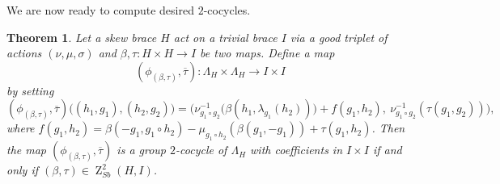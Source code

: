 \documentclass[11pt]{amsart}
\theoremstyle{thrm}
\theoremstyle{plain}
\newtheorem{thm}{Theorem}[section]
\theoremstyle{definition}
\newcommand{\Z}{\operatorname{Z} }
\numberwithin{equation}{section}
\begin{document}
We are now ready to compute desired $2$-cocycles.
\begin{thm}
Let a skew brace $H$ act on a trivial brace $I$ via a good triplet of actions $(\nu,  \mu, \sigma)$ and $\beta, \tau : H \times H \rightarrow I$ be two maps. Define a map
$$(\phi_{(\beta, \tau)}, \overline{\tau}) : \Lambda_H \times \Lambda_H \to I \times I$$
by setting
$$(\phi_{(\beta, \tau)}, \overline{\tau})\big((h_1, g_1), (h_2, g_2)\big)
 =  \big(  \nu^{-1}_{g_1 \circ g_2} \big( \beta(h_1, \lambda_{g_1}(h_2))\big) 
+  f(g_1, h_2),\ \nu^{-1}_{g_1 \circ g_2}(\tau(g_1, g_2)) \big),$$
where $f(g_1, h_2) =  \beta(-g_1, g_1 \circ h_2) - \mu_{g_1 \circ h_2}(\beta(g_1, -g_1))  + \tau(g_1, h_2)$.
Then the map $(\phi_{(\beta, \tau)}, \overline{\tau})$ is a group $2$-cocycle of $\Lambda_H$ with coefficients in $I \times I$ if and only if $(\beta, \tau) \in \Z^2_{Sb}(H,I)$. 
\end{thm}
\end{document}
